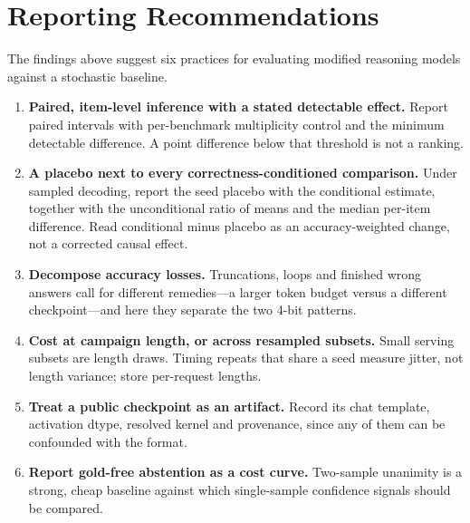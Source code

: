 \documentclass[11pt,a4paper]{article}
\begin{document}
\section{Reporting Recommendations}
\label{sec:recommendations}
The findings above suggest six practices for evaluating modified reasoning models against a stochastic baseline.
\begin{enumerate}
    \item \textbf{Paired, item-level inference with a stated detectable effect.} Report paired intervals with per-benchmark multiplicity control and the minimum detectable difference. A point difference below that threshold is not a ranking.
    \item \textbf{A placebo next to every correctness-conditioned comparison.} Under sampled decoding, report the seed placebo with the conditional estimate, together with the unconditional ratio of means and the median per-item difference. Read conditional minus placebo as an accuracy-weighted change, not a corrected causal effect.
    \item \textbf{Decompose accuracy losses.} Truncations, loops and finished wrong answers call for different remedies---a larger token budget versus a different checkpoint---and here they separate the two 4-bit patterns.
    \item \textbf{Cost at campaign length, or across resampled subsets.} Small serving subsets are length draws. Timing repeats that share a seed measure jitter, not length variance; store per-request lengths.
    \item \textbf{Treat a public checkpoint as an artifact.} Record its chat template, activation dtype, resolved kernel and provenance, since any of them can be confounded with the format.
    \item \textbf{Report gold-free abstention as a cost curve.} Two-sample unanimity is a strong, cheap baseline against which single-sample confidence signals should be compared.
\end{enumerate}
\end{document}
